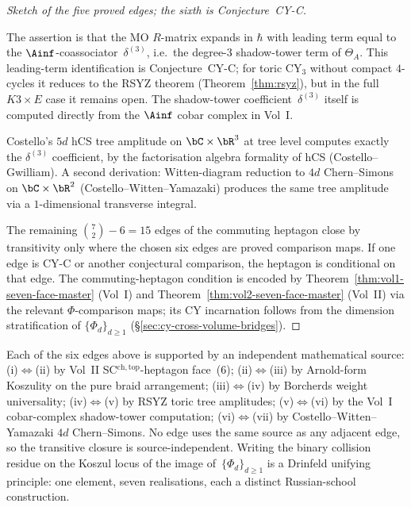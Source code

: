 \begin{proof}[Sketch of the five proved edges; the sixth is
Conjecture~CY-C]
\begin{description}[leftmargin=1.8em]
The assertion is that the MO $R$-matrix expands in $\hbar$ with leading
term equal to the $\Ainf$-coassociator~$\delta^{(3)}$, i.e.\ the
degree-$3$ shadow-tower term of $\Theta_A$. This leading-term
identification is Conjecture~CY-C; for toric CY$_3$ without compact
$4$-cycles it reduces to the RSYZ theorem
(Theorem~\ref{thm:rsyz}), but in the full $K3 \times E$ case it remains
open. The shadow-tower coefficient~$\delta^{(3)}$ itself is computed
directly from the $\Ainf$ cobar complex in Vol~I.
\item[$(\mathrm{vi}) \Leftrightarrow (\mathrm{vii})$]
Costello's $5d$ hCS tree amplitude on $\bC \times \bR^3$ at tree level
computes exactly the $\delta^{(3)}$ coefficient, by the factorisation
algebra formality of hCS (Costello--Gwilliam). A second derivation:
Witten-diagram reduction to $4d$ Chern--Simons on
$\bC \times \bR^2$ (Costello--Witten--Yamazaki) produces the same tree
amplitude via a $1$-dimensional transverse integral.
\end{description}
The remaining $\binom{7}{2} - 6 = 15$ edges of the commuting
heptagon close by transitivity only where the chosen six edges are
proved comparison maps. If one edge is CY-C or another
conjectural comparison, the heptagon is conditional on that edge. The
commuting-heptagon condition is encoded by
Theorem~\ref{thm:vol1-seven-face-master} (Vol~I) and
Theorem~\ref{thm:vol2-seven-face-master} (Vol~II) via
the relevant \(\Phi\)-comparison maps; its CY incarnation follows from the dimension
stratification of $\{\Phi_d\}_{d \ge 1}$
(\S\ref{sec:cy-cross-volume-bridges}).
\end{proof}

\begin{remark}
Each of the six edges above is supported by an independent mathematical source:
(i)$\Leftrightarrow$(ii) by Vol~II SC$^{\mathrm{ch,top}}$-heptagon face~(6);
(ii)$\Leftrightarrow$(iii) by Arnold-form Koszulity on the pure braid
arrangement; (iii)$\Leftrightarrow$(iv) by Borcherds weight
universality; (iv)$\Leftrightarrow$(v) by RSYZ toric tree amplitudes;
(v)$\Leftrightarrow$(vi) by the Vol~I cobar-complex shadow-tower
computation; (vi)$\Leftrightarrow$(vii) by Costello--Witten--Yamazaki
$4d$ Chern--Simons. No edge uses the same source as any
adjacent edge, so the transitive closure is source-independent.
Writing the binary collision residue on the Koszul locus of the
image of~$\{\Phi_d\}_{d \ge 1}$ is a Drinfeld unifying principle: one
element, seven realisations, each a distinct Russian-school
construction.
\end{remark}

